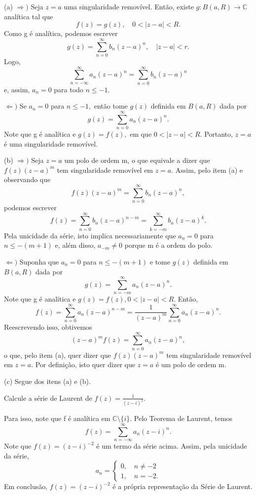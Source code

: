 \documentclass[complex.tex]{subfiles}
\begin{document}
\begin{proof*}
	(a) \(\Rightarrow )\) Seja \(z=a\) uma singularidade removível. Então, existe \(g:B(a, R)\rightarrow \mathbb{C}\) analítica tal que
	\[
		f(z) = g(z),\quad 0<|z-a|<R.
	\]
	Como g é analítica, podemos escrever
	\[
		g(z) = \sum\limits_{n=0}^{\infty}b_{n}(z-a)^{n},\quad |z-a| < r.
	\]
	Logo,
	\[
		\sum\limits_{n=-\infty}^{\infty}a_{n}(z-a)^{n} = \sum\limits_{n=0}^{\infty}b_{n}(z-a)^{n}
	\]
	e, assim, \(a_{n}=0\) para todo \(n\leq -1.\)

	\(\Leftarrow )\) Se \(a_{n}=0\) para \(n\leq -1,\) então tome \(g(z)\) definida em \(B(a, R)\) dada por
	\[
		g(z) = \sum\limits_{n=0}^{\infty}a_{n}(z-a)^{n}.
	\]
	Note que g é analítica e \(g(z) = f(z),\) em que \(0 < |z-a| < R.\) Portanto, \(z=a\) é uma singularidade removível.

	(b) \(\Rightarrow )\) Seja \(z=a\) um polo de ordem m, o que equivale a dizer que \(f(z)(z-a)^{m}\) tem singularidade removível em \(z=a\).
	Assim, pelo item (a) e observando que
	\[
		f(z)(z-a)^{m} = \sum\limits_{n=0}^{\infty}b_{n}(z-a)^{n},
	\]
	podemos escrever
	\[
		f(z) = \sum\limits_{n=0}^{\infty}b_{n}(z-a)^{n-m} = \sum\limits_{k=-m}^{\infty}b_{n}(z-a)^{k}.
	\]
	Pela unicidade da série, isto implica necessariamente que \(a_{n}=0\) para \(n\leq -(m+1)\) e, além disso, \(a_{-m}\neq0\) porque
	m é a ordem do polo.

	\(\Leftarrow )\) Suponha que \(a_{n} = 0\) para \(n\leq -(m+1)\) e tome \(g(z)\) definida em \(B(a, R)\) dada por
	\[
		g(z) = \sum\limits_{n=-m}^{\infty}a_{n}(z-a)^{n}.
	\]
	Note que g é analítica e \(g(z) = f(z), 0 < |z-a| < R.\) Então,
	\[
		f(z) = \sum\limits_{n=0}^{\infty}a_{n}(z-a)^{n-m} = \frac{1}{(z-a)^{m}}\sum\limits_{n=0}^{\infty}a_{n}(z-a)^{n}.
	\]
	Reescrevendo isso, obtivemos
	\[
		(z-a)^{m}f(z) = \sum\limits_{n=0}^{\infty}a_{n}(z-a)^{n},
	\]
	o que, pelo item (a), quer dizer que \(f(z)(z-a)^{m}\) tem singularidade removível em \(z=a.\) Por definição, isto quer dizer que
	\(z=a\) é um polo de ordem m.

	(c) Segue dos itens (a) e (b). \qedsymbol
\end{proof*}
\begin{example}
	Calcule a série de Laurent de \(f(z) = \frac{1}{(z-i)^{2}}.\)

	Para isso, note que f é analítica em \(\mathbb{C}\setminus{\{i\}}.\) Pelo Teorema de Laurent, temos
	\[
		f(z) = \sum\limits_{n=-\infty}^{\infty}a_{n}(z-i)^{n}.
	\]
	Note que \(f(z) = (z-i)^{-2}\) é um termo da série acima. Assim, pela unicidade da série,
	\[
		a_{n} = \left\{\begin{array}{ll}
			0,\quad n\neq-2 \\
			1,\quad n = -2.
		\end{array}\right.
	\]
	Em conclusão, \(f(z) = (z-i)^{-2}\) é a própria representação da Série de Laurent.
\end{example}
\end{document}
